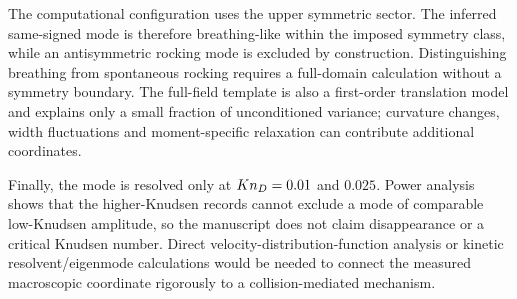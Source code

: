 The computational configuration uses the upper symmetric sector. The inferred same-signed mode is therefore breathing-like within the imposed symmetry class, while an antisymmetric rocking mode is excluded by construction. Distinguishing breathing from spontaneous rocking requires a full-domain calculation without a symmetry boundary. The full-field template is also a first-order translation model and explains only a small fraction of unconditioned variance; curvature changes, width fluctuations and moment-specific relaxation can contribute additional coordinates.

Finally, the mode is resolved only at $Kn_D=0.01$ and $0.025$. Power analysis shows that the higher-Knudsen records cannot exclude a mode of comparable low-Knudsen amplitude, so the manuscript does not claim disappearance or a critical Knudsen number. Direct velocity-distribution-function analysis or kinetic resolvent/eigenmode calculations would be needed to connect the measured macroscopic coordinate rigorously to a collision-mediated mechanism.
